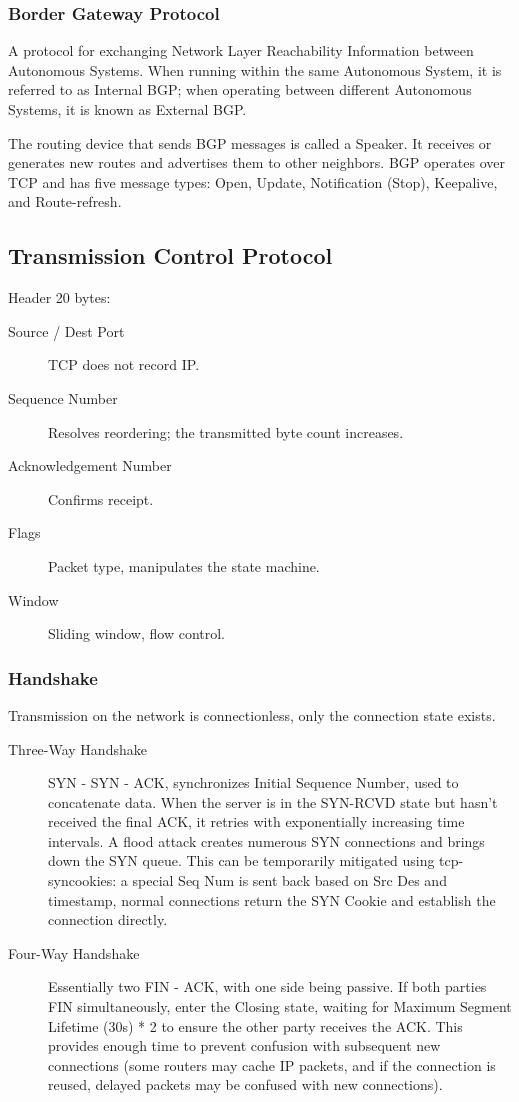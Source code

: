 \documentclass[11pt,journal,compsoc]{IEEEtran}
\begin{document}
\subsubsection{Border Gateway Protocol}

A protocol for exchanging Network Layer Reachability Information between Autonomous Systems. When running within the same Autonomous System, it is referred to as Internal BGP; when operating between different Autonomous Systems, it is known as External BGP.

The routing device that sends BGP messages is called a Speaker. It receives or generates new routes and advertises them to other neighbors. BGP operates over TCP and has five message types: Open, Update, Notification (Stop), Keepalive, and Route-refresh.

\subsection{Transmission Control Protocol}

Header 20 bytes:

\begin{description}
    \item[Source / Dest Port] TCP does not record IP.
    \item[Sequence Number] Resolves reordering; the transmitted byte count increases.
    \item[Acknowledgement Number] Confirms receipt.
    \item[Flags] Packet type, manipulates the state machine.
    \item[Window] Sliding window, flow control.
\end{description}

\subsubsection{Handshake}

Transmission on the network is connectionless, only the connection state exists.

\begin{description}
    \item[Three-Way Handshake] SYN - SYN - ACK, synchronizes Initial Sequence Number, used to concatenate data. When the server is in the SYN-RCVD state but hasn't received the final ACK, it retries with exponentially increasing time intervals. A flood attack creates numerous SYN connections and brings down the SYN queue. This can be temporarily mitigated using tcp-syncookies: a special Seq Num is sent back based on Src Des and timestamp, normal connections return the SYN Cookie and establish the connection directly.
    \item[Four-Way Handshake] Essentially two FIN - ACK, with one side being passive. If both parties FIN simultaneously, enter the Closing state, waiting for Maximum Segment Lifetime (30s) * 2 to ensure the other party receives the ACK. This provides enough time to prevent confusion with subsequent new connections (some routers may cache IP packets, and if the connection is reused, delayed packets may be confused with new connections).
\end{description}
\end{document}
